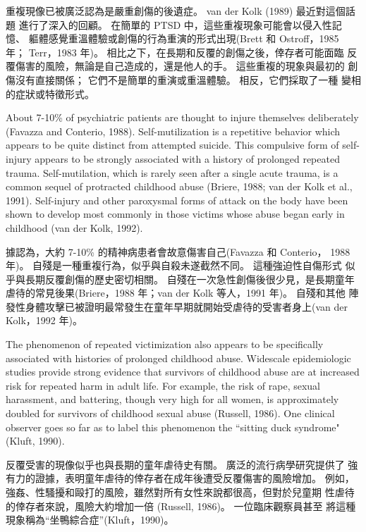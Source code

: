 \documentclass[12pt]{article}
\begin{document}
    重複現像已被廣泛認為是嚴重創傷的後遺症。 van der Kolk (1989) 最近對這個話題
    進行了深入的回顧。 在簡單的 PTSD 中，這些重複現象可能會以侵入性記憶、
    軀體感覺重溫體驗或創傷的行為重演的形式出現(Brett 和 Ostroff，1985 年；
    Terr，1983 年)。 相比之下，在長期和反覆的創傷之後，倖存者可能面臨
    反覆傷害的風險，無論是自己造成的，還是他人的手。 這些重複的現象與最初的
    創傷沒有直接關係； 它們不是簡單的重演或重溫體驗。 相反，它們採取了一種
    變相的症狀或特徵形式。

    About 7-10\% of psychiatric patients are thought to injure themselves
    deliberately (Favazza and Conterio, 1988). Self-mutilization is a
    repetitive behavior which appears to be quite distinct from attempted
    suicide. This compulsive form of self-injury appears to be strongly
    associated with a history of prolonged repeated trauma. Self-mutilation,
    which is rarely seen after a single acute trauma, is a common sequel of
    protracted childhood abuse (Briere, 1988; van der Kolk et al., 1991).
    Self-injury and other paroxysmal forms of attack on the body have been
    shown to develop most commonly in those victims whose abuse began early in
    childhood (van der Kolk, 1992).

    據認為，大約 7-10\% 的精神病患者會故意傷害自己(Favazza 和 Conterio，
    1988 年)。 自殘是一種重複行為，似乎與自殺未遂截然不同。 這種強迫性自傷形式
    似乎與長期反覆創傷的歷史密切相關。 自殘在一次急性創傷後很少見，是長期童年
    虐待的常見後果(Briere，1988 年；van der Kolk 等人，1991 年)。 自殘和其他
    陣發性身體攻擊已被證明最常發生在童年早期就開始受虐待的受害者身上(van der
    Kolk，1992 年)。

    The phenomenon of repeated victimization also appears to be specifically
    associated with histories of prolonged childhood abuse. Widescale
    epidemiologic studies provide strong evidence that survivors of childhood
    abuse are at increased risk for repeated harm in adult life. For example,
    the risk of rape, sexual harassment, and battering, though very high for
    all women, is approximately doubled for survivors of childhood sexual abuse
    (Russell, 1986). One clinical observer goes so far as to label this
    phenomenon the ``sitting duck syndrome" (Kluft, 1990).

    反覆受害的現像似乎也與長期的童年虐待史有關。 廣泛的流行病學研究提供了
    強有力的證據，表明童年虐待的倖存者在成年後遭受反覆傷害的風險增加。 例如，
    強姦、性騷擾和毆打的風險，雖然對所有女性來說都很高，但對於兒童期
    性虐待的倖存者來說，風險大約增加一倍 (Russell, 1986)。 一位臨床觀察員甚至
    將這種現象稱為“坐鴨綜合症”(Kluft，1990)。
\end{document}
